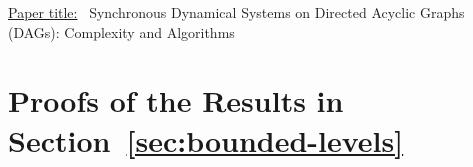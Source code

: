 
\appendix

\onecolumn

\begin{center}
\end{center}

\bigskip

\noindent
\underline{Paper title:}~
Synchronous Dynamical Systems on Directed Acyclic Graphs (DAGs): 
Complexity and Algorithms

\bigskip

\noindent
\section{Proofs of the Results in Section~\ref{sec:bounded-levels}}

\medskip

\iffalse
\noindent
\textbf{Statement and Proof of Proposition~\ref{pro:long_phase_space_cycle}}

\medskip

\underline{Statement of Proposition~\ref{pro:long_phase_space_cycle}:}~
For every $n  > 1$, there is an $n$ node DAG SyDS
whose phase space graph is a cycle of length $2^n$.

\medskip

\noindent
\textbf{Proof:}~
For a given $n > 1$ we construct the DAG SyDS $S_n$ to be a counter,
as follows.  The underlying graph contains $n$ levels, one node per
level.  For each node, there is an incoming edge from the nodes on
each of the lower levels.  The transition function for each node
is the function that retains the current value of the node if any
of the lower order bits is 0, and changes the value of the node if
all of the lower order bits are 1.

Suppose a given configuration of $S_n$ is interpreted as encoding
an integer $k$, $0 \leq k < 2^n$.  Then the successor configuration
encodes the integer $k + 1 \mod 2^n$.  Thus, the phase space of
$S_n$ is a cycle of length $2^n$.  \QED
\fi
